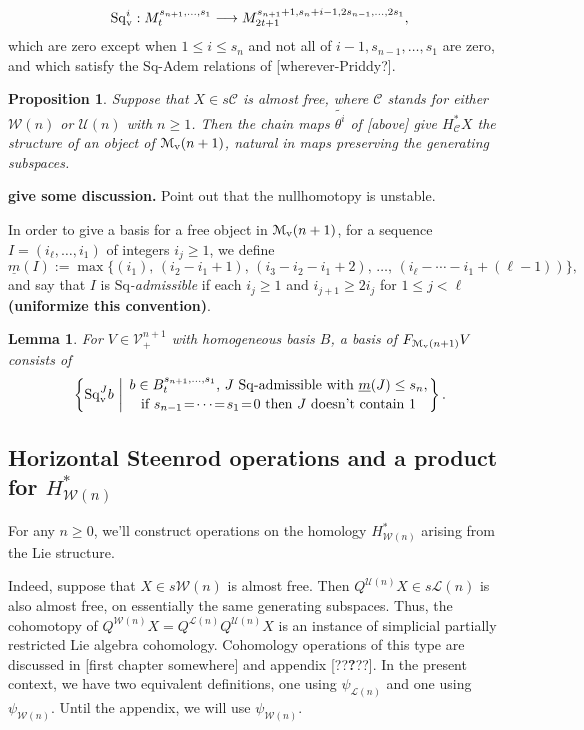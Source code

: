 \documentclass[11pt]{amsart}
\theoremstyle{plain}
\newtheorem{lem}[thm]{Lemma}
\newtheorem{prop}[thm]{Proposition}
\theoremstyle{definition}
\renewcommand{\to}{\longrightarrow}
\newcommand{\calW}{\mathcal{W}}
\newcommand{\calU}{\mathcal{U}}
\newcommand{\calL}{\mathcal{L}}
\newcommand{\calC}{\mathcal{C}}
\newcommand{\calV}{\mathcal{V}}
\newcommand{\calM}{\mathcal{M}}
\theoremstyle{plain}
\newcommand{\vect}[2]{\calV^{#1}_{#2}}
\newcommand{\minDimSq}{\underline{m}}
\newcommand{\Sq}{\mathrm{Sq}}
\begin{document}
\begin{Cohomology operations for all unstable Lie algebras}
\[\Sq_\textup{v}^i:M^{s_{n+1},\ldots,s_1}_t\to M^{s_{n+1}+1,s_n+i-1,2s_{n-1},\ldots,2s_1}_{2t+1},\]
which are zero except when $1\leq i \leq s_n$ and not all of $i-1,s_{n-1},\ldots,s_1$ are zero, and which
satisfy the $\Sq$-Adem relations of [wherever-Priddy?].
\begin{prop}\label{vertical steenrod operations prop}
Suppose that $X\in s\calC$ is almost free, where $\calC$ stands for either $\calW(n)$ or $\calU(n)$ with $n\geq1$. Then the chain maps $\widetilde{\theta^i}$ of [above] give $H^*_{\calC}X$ the structure of an object of $\calM_\textup{v}(n+1)$, natural in maps preserving the generating subspaces.
\end{prop}
\textbf{give some discussion.} Point out that the nullhomotopy is unstable.

In order to give a basis for a free object in $\calM_\textup{v}(n+1)$, for a sequence $I=(i_\ell,\ldots,i_1)$ of integers $i_j\geq1$, we define
\[\minDimSq(I):=\max\{(i_1),\,(i_2-i_1+1),\,(i_3-i_2-i_1+2),\,\ldots,\,(i_{\ell}-\cdots-i_1+(\ell-1))\},
\]
and say that $I$ is \emph{$\Sq$-admissible} if each $i_j\geq1$ and $i_{j+1}\geq 2i_j$ for $1\leq j <\ell$ \textbf{(uniformize this convention)}.
\begin{lem}
For $V\in\vect{n+1}{+}$ with homogeneous basis $B$, a basis of $F_{\calM_\textup{v}(n+1)}V$ consists of
\[\left\{\Sq^J_{\textup{v}}b\ \middle|\ \genfrac{}{}{0pt}{}{b\in B^{s_{n+1},\ldots,s_1}_t\textup{, $J$ $\Sq$-admissible with }\minDimSq(J)\leq s_n,}{\textup{if }s_{n-1}\!=\!\cdots\!=\!s_1\!=\!0\textup{ then $J$ doesn't contain 1}}\right\}.\]


\end{lem}

\subsection{Horizontal Steenrod operations and a product for $H^*_{\calW(n)}$}
For any $n\geq 0$, we'll construct operations on the homology $H^*_{\calW(n)}$ arising from the Lie structure.

Indeed, suppose that $X\in s\calW(n)$ is almost free. Then $Q^{\calU(n)}X\in s\calL(n)$ is also almost free, on essentially the same generating subspaces. Thus, the cohomotopy of $Q^{\calW(n)}X=Q^{\calL(n)}Q^{\calU(n)}X$ is an instance of simplicial partially restricted Lie algebra cohomology. Cohomology operations of this type are discussed in [first chapter somewhere] and appendix [??\textbf{?}??]. In the present context, we have two equivalent definitions, one using $\psi_{\calL(n)}$ and one using $\psi_{\calW(n)}$. Until the appendix, we will use $\psi_{\calW(n)}$.


\end{Cohomology operations for all unstable Lie algebras}
\end{document}
